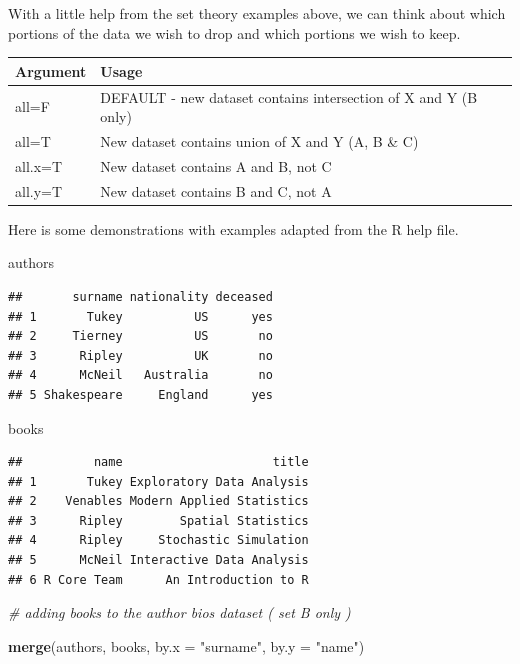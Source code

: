 \documentclass[]{book}
\newenvironment{Shaded}{\begin{snugshade}}{\end{snugshade}}
\newcommand{\CommentTok}[1]{\textcolor[rgb]{0.56,0.35,0.01}{\textit{#1}}}
\newcommand{\DataTypeTok}[1]{\textcolor[rgb]{0.13,0.29,0.53}{#1}}
\newcommand{\KeywordTok}[1]{\textcolor[rgb]{0.13,0.29,0.53}{\textbf{#1}}}
\newcommand{\NormalTok}[1]{#1}
\newcommand{\StringTok}[1]{\textcolor[rgb]{0.31,0.60,0.02}{#1}}
\theoremstyle{definition}
\theoremstyle{definition}
\theoremstyle{definition}
\theoremstyle{remark}
\begin{document}
With a little help from the set theory examples above, we can think
about which portions of the data we wish to drop and which portions we
wish to keep.

\begin{longtable}[]{@{}ll@{}}
\toprule
Argument & Usage\tabularnewline
\midrule
\endhead
all=F & DEFAULT - new dataset contains intersection of X and Y (B
only)\tabularnewline
all=T & New dataset contains union of X and Y (A, B \& C)\tabularnewline
all.x=T & New dataset contains A and B, not C\tabularnewline
all.y=T & New dataset contains B and C, not A\tabularnewline
\bottomrule
\end{longtable}

Here is some demonstrations with examples adapted from the R help file.

\begin{Shaded}
\begin{Highlighting}[]
\NormalTok{authors   }
\end{Highlighting}
\end{Shaded}

\begin{verbatim}
##       surname nationality deceased
## 1       Tukey          US      yes
## 2     Tierney          US       no
## 3      Ripley          UK       no
## 4      McNeil   Australia       no
## 5 Shakespeare     England      yes
\end{verbatim}

\begin{Shaded}
\begin{Highlighting}[]
\NormalTok{books    }
\end{Highlighting}
\end{Shaded}

\begin{verbatim}
##          name                     title
## 1       Tukey Exploratory Data Analysis
## 2    Venables Modern Applied Statistics
## 3      Ripley        Spatial Statistics
## 4      Ripley     Stochastic Simulation
## 5      McNeil Interactive Data Analysis
## 6 R Core Team      An Introduction to R
\end{verbatim}

\begin{Shaded}
\begin{Highlighting}[]
\CommentTok{# adding books to the author bios dataset  ( set B only )}

\KeywordTok{merge}\NormalTok{(authors, books, }\DataTypeTok{by.x =} \StringTok{"surname"}\NormalTok{, }\DataTypeTok{by.y =} \StringTok{"name"}\NormalTok{)    }
\end{Highlighting}
\end{Shaded}
\end{document}
